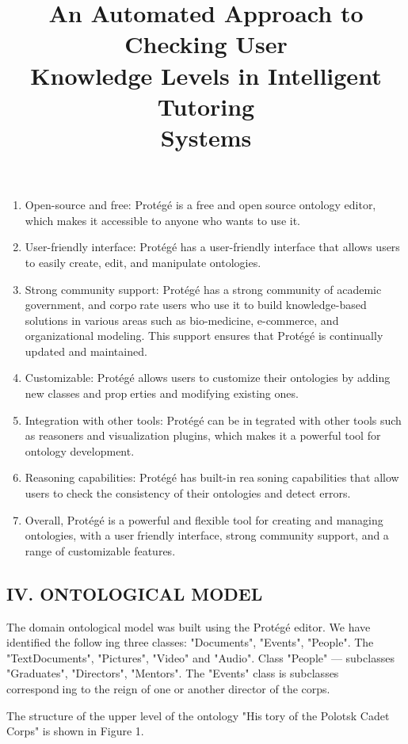 \documentclass{article}
\title{\LARGE\textbf{An Automated Approach to Checking User\\ Knowledge Levels in Intelligent Tutoring\\ Systems}}
\date{}
\begin{document}
\begin{multicols}{2}
\setcounter{page}{267} 
\begin{enumerate}[noitemsep]
    \item Open-source and free: Protégé is a free and opensource ontology editor, which makes it accessible to anyone who wants to use it.
    \item User-friendly interface: Protégé has a user-friendly interface that allows users to easily create, edit, and manipulate ontologies.
    \item Strong community support: Protégé has a strong community of academic government, and corporate users who use it to build knowledge-based
solutions in various areas such as bio-medicine, e-commerce, and organizational modeling. This support ensures that Protégé is continually updated and maintained.
    \item  Customizable: Protégé allows users to customize
their ontologies by adding new classes and properties and modifying existing ones.
    \item  Integration with other tools: Protégé can be integrated with other tools such as reasoners and
visualization plugins, which makes it a powerful
tool for ontology development.
    \item Reasoning capabilities: Protégé has built-in reasoning capabilities that allow users to check the
consistency of their ontologies and detect errors.
    \item Overall, Protégé is a powerful and flexible tool
for creating and managing ontologies, with a userfriendly interface, strong community support, and
a range of customizable features.
\end{enumerate}
\vspace{7pt}
\begin{center}
 \chapter{IV. ONTOLOGICAL MODEL} 
\end{center}
\vspace{7pt}
\par The domain ontological model was built using
the Protégé editor. We have identified the following three classes: "Documents", "Events", "People".
The "TextDocuments", "Pictures", "Video" and "Audio".
Class "People" — subclasses "Graduates", "Directors",
"Mentors". The "Events" class is subclasses corresponding to the reign of one or another director of the corps.
\par The structure of the upper level of the ontology "History of the Polotsk Cadet Corps" is shown in Figure 1.
\vspace{7pt}
\begin{center}

\end{center}
\end{multicols}
\end{document}
